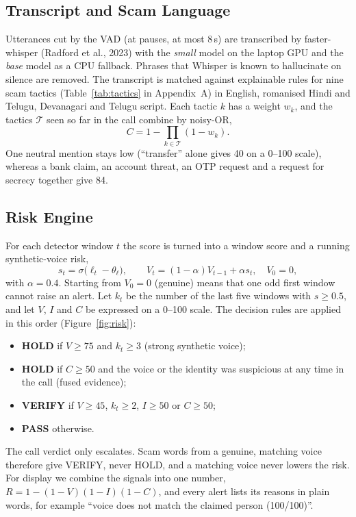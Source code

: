 \documentclass[10pt,a4paper,twocolumn]{article}
\newcommand{\llr}{\ell}
\begin{document}
\subsection{Transcript and Scam Language}
Utterances cut by the VAD (at pauses, at most 8\,s) are transcribed by faster-whisper (Radford et al., 2023) with the \emph{small} model on the laptop GPU and the \emph{base} model as a CPU fallback. Phrases that Whisper is known to hallucinate on silence are removed. The transcript is matched against explainable rules for nine scam tactics (Table~\ref{tab:tactics} in Appendix~A) in English, romanised Hindi and Telugu, Devanagari and Telugu script. Each tactic $k$ has a weight $w_k$, and the tactics $\mathcal{T}$ seen so far in the call combine by noisy-OR,
\begin{equation}
C=1-\prod_{k\in\mathcal{T}}(1-w_k).
\label{eq:scam}
\end{equation}
One neutral mention stays low (``transfer'' alone gives 40 on a 0--100 scale), whereas a bank claim, an account threat, an OTP request and a request for secrecy together give 84.

\subsection{Risk Engine}
For each detector window $t$ the score is turned into a window score and a running synthetic-voice risk,
\begin{equation}
s_t=\sigma\big(\llr_t-\theta_{\ell}\big),\qquad V_t=(1-\alpha)V_{t-1}+\alpha s_t,\quad V_0=0,
\label{eq:ema}
\end{equation}
with $\alpha=0.4$. Starting from $V_0=0$ (genuine) means that one odd first window cannot raise an alert. Let $k_t$ be the number of the last five windows with $s\geq0.5$, and let $V$, $I$ and $C$ be expressed on a 0--100 scale. The decision rules are applied in this order (Figure~\ref{fig:risk}):
\begin{itemize}\setlength\itemsep{0pt}
\item \textbf{HOLD} if $V\geq75$ and $k_t\geq3$ (strong synthetic voice);
\item \textbf{HOLD} if $C\geq50$ and the voice or the identity was suspicious at any time in the call (fused evidence);
\item \textbf{VERIFY} if $V\geq45$, $k_t\geq2$, $I\geq50$ or $C\geq50$;
\item \textbf{PASS} otherwise.
\end{itemize}
The call verdict only escalates. Scam words from a genuine, matching voice therefore give VERIFY, never HOLD, and a matching voice never lowers the risk. For display we combine the signals into one number, $R=1-(1-V)(1-I)(1-C)$, and every alert lists its reasons in plain words, for example ``voice does not match the claimed person (100/100)''.
\end{document}
